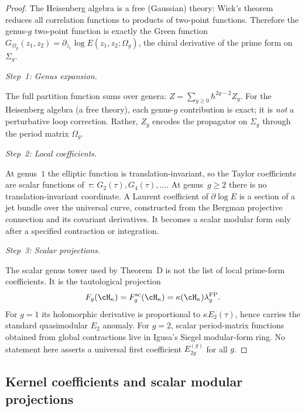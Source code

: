 \begin{proof}
The Heisenberg algebra is a free (Gaussian) theory: Wick's theorem
reduces all correlation functions to products of two-point functions.
Therefore the genus-$g$ two-point function is exactly the Green function
$G_{\Omega_g}(z_1, z_2) = \partial_{z_1}\log E(z_1, z_2; \Omega_g)$,
the chiral derivative of the prime form on $\Sigma_g$.

\emph{Step~1: Genus expansion.}

The full partition function sums over genera: $Z = \sum_{g \geq 0} \hbar^{2g-2} Z_g$. For the Heisenberg algebra (a free theory), each genus-$g$ contribution is exact; it is \emph{not} a perturbative loop correction. Rather, $Z_g$ encodes the propagator on $\Sigma_g$ through the period matrix $\Omega_g$.

\emph{Step~2: Local coefficients.}

At genus~$1$ the elliptic function is translation-invariant, so the
Taylor coefficients are scalar functions of~$\tau$:
$G_2(\tau),G_4(\tau),\ldots$. At genus~$g\ge2$ there is no
translation-invariant coordinate. A Laurent coefficient of
$\partial\log E$ is a section of a jet bundle over the universal
curve, constructed from the Bergman projective connection and its
covariant derivatives. It becomes a scalar modular form only after a
specified contraction or integration.

\emph{Step~3: Scalar projections.}

The scalar genus tower used by Theorem~D is not the list of local
prime-form coefficients. It is the tautological projection
\[
F_g(\cH_\kappa)=F_g^{\mathrm{sc}}(\cH_\kappa)
=\kappa(\cH_\kappa)\lambda_g^{\mathrm{FP}}.
\]
For $g=1$ its holomorphic derivative is proportional to
$\kappa E_2(\tau)$, hence carries the standard quasimodular
$E_2$ anomaly. For $g=2$, scalar
period-matrix functions obtained from global contractions live in
Igusa's Siegel modular-form ring. No statement here asserts a
universal first coefficient $E_{2g}^{(g)}$ for all $g$.
\end{proof}

\subsection{Kernel coefficients and scalar modular projections}
\label{subsec:modular-weights-all-genus}


